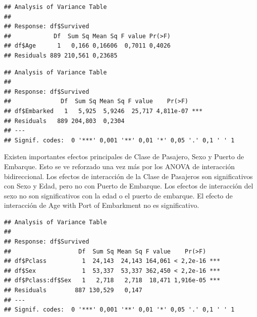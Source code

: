\documentclass[]{article}
\newenvironment{Shaded}{\begin{snugshade}}{\end{snugshade}}
\newcommand{\KeywordTok}[1]{\textcolor[rgb]{0.13,0.29,0.53}{\textbf{#1}}}
\newcommand{\StringTok}[1]{\textcolor[rgb]{0.31,0.60,0.02}{#1}}
\newcommand{\OperatorTok}[1]{\textcolor[rgb]{0.81,0.36,0.00}{\textbf{#1}}}
\newcommand{\NormalTok}[1]{#1}
\begin{document}
\begin{verbatim}
## Analysis of Variance Table
## 
## Response: df$Survived
##            Df  Sum Sq Mean Sq F value Pr(>F)
## df$Age      1   0,166 0,16606  0,7011 0,4026
## Residuals 889 210,561 0,23685
\end{verbatim}

\begin{Shaded}
\end{Shaded}

\begin{verbatim}
## Analysis of Variance Table
## 
## Response: df$Survived
##              Df  Sum Sq Mean Sq F value    Pr(>F)    
## df$Embarked   1   5,925  5,9246  25,717 4,811e-07 ***
## Residuals   889 204,803  0,2304                      
## ---
## Signif. codes:  0 '***' 0,001 '**' 0,01 '*' 0,05 '.' 0,1 ' ' 1
\end{verbatim}

Existen importantes efectos principales de Clase de Pasajero, Sexo y
Puerto de Embarque. Esto se ve reforzado una vez más por los ANOVA de
interacción bidireccional. Los efectos de interacción de la Clase de
Pasajeros son significativos con Sexo y Edad, pero no con Puerto de
Embarque. Los efectos de interacción del sexo no son significativos con
la edad o el puerto de embarque. El efecto de interacción de Age with
Port of Embarkment no es significativo.

\begin{Shaded}
\end{Shaded}

\begin{verbatim}
## Analysis of Variance Table
## 
## Response: df$Survived
##                   Df  Sum Sq Mean Sq F value    Pr(>F)    
## df$Pclass          1  24,143  24,143 164,061 < 2,2e-16 ***
## df$Sex             1  53,337  53,337 362,450 < 2,2e-16 ***
## df$Pclass:df$Sex   1   2,718   2,718  18,471 1,916e-05 ***
## Residuals        887 130,529   0,147                      
## ---
## Signif. codes:  0 '***' 0,001 '**' 0,01 '*' 0,05 '.' 0,1 ' ' 1
\end{verbatim}
\end{document}
